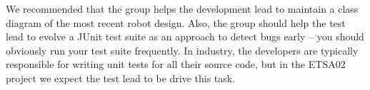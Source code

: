\documentclass{scrreprt}
\begin{document}
We recommended that the group helps the development lead to maintain a class diagram of the most recent robot design. Also, the group should help the test lead to evolve a JUnit test suite as an approach to detect bugs early -- you should obviously run your test suite frequently. In industry, the developers are typically responsible for writing unit tests for all their source code, but in the ETSA02 project we expect the test lead to be drive this task. 
\end{document}
